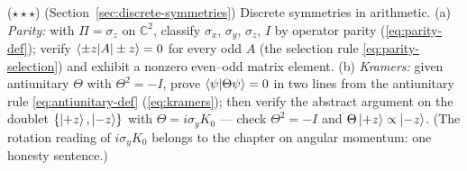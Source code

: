 \begin{problemset}
\item ($\star\star\star$) (Section~\ref{sec:discrete-symmetries}) Discrete symmetries in arithmetic. (a) \emph{Parity:} with $\Pi = \sigma_z$ on $\mathbb{C}^2$, classify $\sigma_x$, $\sigma_y$, $\sigma_z$, $I$ by operator parity (\eqref{eq:parity-def}); verify $\braket{\pm z|A|\pm z} = 0$ for every odd $A$ (the selection rule \eqref{eq:parity-selection}) and exhibit a nonzero even--odd matrix element. (b) \emph{Kramers:} given antiunitary $\Theta$ with $\Theta^2 = -I$, prove $\braket{\psi|\Theta\psi} = 0$ in two lines from the antiunitary rule \eqref{eq:antiunitary-def} (\eqref{eq:kramers}); then verify the abstract argument on the doublet $\{\ket{+z},\ket{-z}\}$ with $\Theta = i\sigma_y K_0$ --- check $\Theta^2 = -I$ and $\Theta\ket{+z} \propto \ket{-z}$. (The rotation reading of $i\sigma_y K_0$ belongs to the chapter on angular momentum: one honesty sentence.)
\end{problemset}
